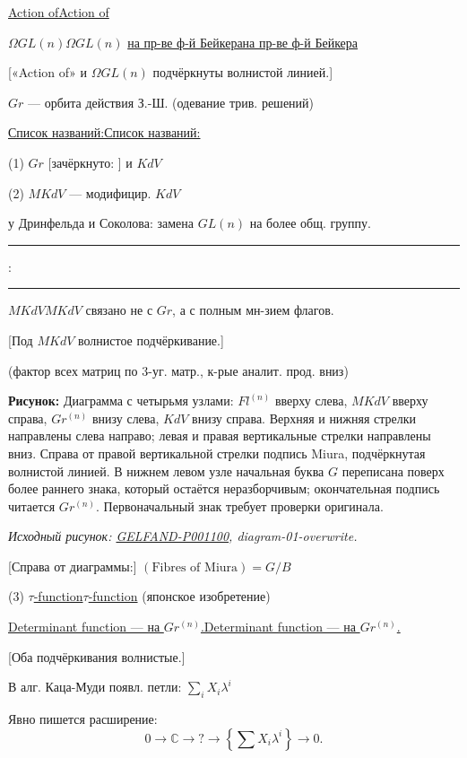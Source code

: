 \documentclass[11pt]{article}
\theoremstyle{definition}
\theoremstyle{remark}
\newcommand{\Unclear}[3]{%
  \begingroup\color{orange!70!black}%
  [Unresolved reading #1/#2: #3]\endgroup%
}
\newcommand{\SourceFigure}[3]{%
  \par\begingroup\color{blue!60!black}\textbf{\hyperref[#1:source-page]{Source figure #1/#2}:} #3%
  \par\textit{Consult the authoritative scan at this locator.}\endgroup\par%
}
\renewcommand{\Unclear}[3]{%
  \begingroup\color{orange!65!black}%
  \ifmmode\text{[неясно: #3]}\else[неясно: #3]\fi\endgroup%
}
\renewcommand{\SourceFigure}[3]{%
  \par\begingroup\color{blue!55!black}\textbf{Рисунок:} #3%
  \par{\small\textit{Исходный рисунок: \hyperref[#1:source-page]{#1}, #2.}}%
  \endgroup\par%
}
\let\DiplomaticMathUnderline\underline
\renewcommand{\underline}[1]{\ifmmode\DiplomaticMathUnderline{#1}\else\uline{#1}\fi}
\begin{document}
\underline{Action of}

\underline{$\Omega GL(n)$} \underline{на пр-ве ф-й Бейкера}

[«Action of» и $\Omega GL(n)$ подчёркнуты волнистой линией.]

$Gr$ — орбита действия З.-Ш. (одевание трив. решений)

\underline{Список названий:}

(1) $Gr$ [зачёркнуто: \Unclear{GELFAND-P001100}{list-01-cancel}{KdV}] и $KdV$

(2) $MKdV$ — модифицир. $KdV$

у Дринфельда и Соколова: замена $GL(n)$ на более общ. группу.

\begin{center}
\rule{12mm}{0.3pt}\quad :\quad\rule{12mm}{0.3pt}
\end{center}

\underline{$MKdV$} связано не с $Gr$, а с полным мн-зием флагов.

[Под $MKdV$ волнистое подчёркивание.]

(фактор всех матриц по 3-уг. матр., к-рые аналит. прод. вниз)

\SourceFigure{GELFAND-P001100}{diagram-01-overwrite}{Диаграмма с четырьмя узлами: $Fl^{(n)}$ вверху слева, $MKdV$ вверху справа, $Gr^{(n)}$ внизу слева, $KdV$ внизу справа. Верхняя и нижняя стрелки направлены слева направо; левая и правая вертикальные стрелки направлены вниз. Справа от правой вертикальной стрелки подпись Miura, подчёркнутая волнистой линией. В нижнем левом узле начальная буква $G$ переписана поверх более раннего знака, который остаётся неразборчивым; окончательная подпись читается $Gr^{(n)}$. Первоначальный знак требует проверки оригинала.}

[Справа от диаграммы:] $(\text{Fibres of Miura})=G/B$

(3) \underline{$\tau$-function} (японское изобретение)

\underline{Determinant function — на $Gr^{(n)}$.}

[Оба подчёркивания волнистые.]

В алг. Каца-Муди появл. петли: $\displaystyle\sum_i X_i\lambda^i$

Явно пишется расширение:
\begin{equation*}
0\to\mathbb{C}\to ?\to\left\{\sum X_i\lambda^i\right\}\to0.
\end{equation*}
\end{document}
